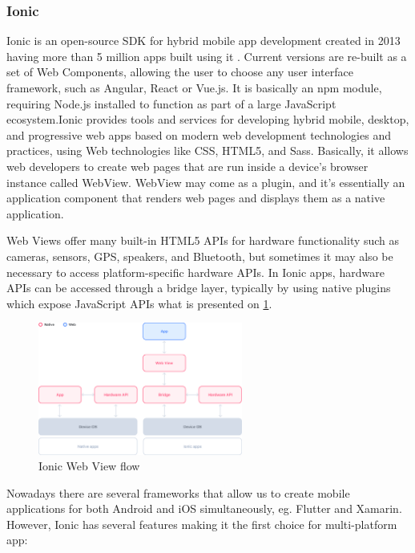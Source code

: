 \documentclass[../Main.tex]{subfiles}
\begin{document}
    \subsubsection{Ionic}
    Ionic is an open-source SDK for hybrid mobile app development created in 2013 having more than 5 million apps built using it \cite{ionic}. Current versions are re-built as a set of Web Components, allowing the user to choose any user interface framework, such as Angular, React or Vue.js. It is basically an npm module, requiring Node.js installed to function as part of a large JavaScript ecosystem.Ionic provides tools and services for developing hybrid mobile, desktop, and progressive web apps based on modern web development technologies and practices, using Web technologies like CSS, HTML5, and Sass. Basically, it allows web developers to create web pages that are run inside a device’s browser instance called WebView. WebView may come as a plugin, and it’s essentially an application component that renders web pages and displays them as a native application.
    
    Web Views offer many built-in HTML5 APIs for hardware functionality such as cameras, sensors, GPS, speakers, and Bluetooth, but sometimes it may also be necessary to access platform-specific hardware APIs. In Ionic apps, hardware APIs can be accessed through a bridge layer, typically by using native plugins which expose JavaScript APIs what is presented on \ref{fig:ionic-flow}.
    
    \begin{figure}[ht]
        \centering
        \includegraphics[width=0.6\textwidth]{Images/03_ionic_webview.png}
        \caption{Ionic Web View flow}
            \label{fig:ionic-flow}
    \end{figure}
    
    Nowadays there are several frameworks that allow us to create mobile applications for both Android and iOS simultaneously, eg. Flutter and Xamarin. However, Ionic has several features making it the first choice for multi-platform app:
    
\end{document}
